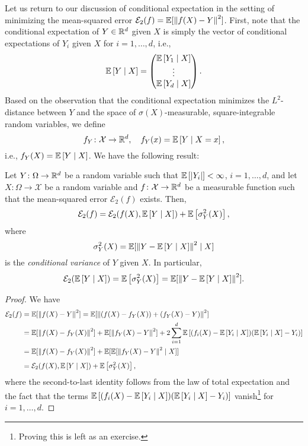 Let us return to our discussion of conditional expectation in the setting of minimizing the mean-squared error $\mathcal{E}_2(f) = \mathbb{E}[\norm{f(X) - Y}^2]$. First, note that the conditional expectation of $Y \in \mathbb{R}^d$ given $X$ is simply the vector of conditional expectations of $Y_i$ given $X$ for $i = 1, \dots, d$, i.e.,
\[
    \mathbb{E}\left[Y \mathrel{|} X\right] = \begin{pmatrix}
        \mathbb{E}\left[Y_1 \mathrel{|} X\right] \\
        \vdots \\
        \mathbb{E}\left[Y_d \mathrel{|} X\right]
    \end{pmatrix}.
\]
Based on the observation that the conditional expectation minimizes the $L^2$-distance between $Y$ and the space of $\sigma(X)$-measurable, square-integrable random variables, we define
\[
    f_Y \colon \mathcal{X} \to \mathbb{R}^d, \quad f_Y(x) = \mathbb{E}\left[Y \mathrel{|} X = x\right],
\]
i.e., $f_Y(X) = \mathbb{E}\left[Y \mathrel{|} X\right]$. We have the following result:
\begin{proposition}
\label{prop: decomposition of mean-squared error}
Let $Y \colon \Omega \to \mathbb{R}^d$ be a random variable such that $\mathbb{E}\left[\abs{Y_i}\right] < \infty$, $i = 1, \dots, d$, and let $X \colon \Omega \to \mathcal{X}$ be a random variable and $f \colon \mathcal{X} \to \mathbb{R}^d$ be a measurable function such that the mean-squared error $\mathcal{E}_2(f)$ exists. Then,
\[
    \mathcal{E}_2(f) = \mathcal{E}_2(f(X), \mathbb{E}\left[Y \mathrel{|} X\right]) + \mathbb{E}\left[\sigma_Y^2(X)\right],
\]
where
\[
    \sigma_Y^2(X) = \mathbb{E}[\norm{Y - \mathbb{E}\left[Y \mathrel{|} X\right]}^2 \mathrel{|} X]
\]
is the \emph{conditional variance} of $Y$ given $X$. In particular,
\[
    \mathcal{E}_2(\mathbb{E}\left[Y \mathrel{|} X\right]) = \mathbb{E}\left[\sigma_Y^2(X)\right] = \mathbb{E}[\norm{Y - \mathbb{E}\left[Y \mathrel{|} X\right]}^2].
\]
\end{proposition}

\begin{proof}
We have
\begin{align*}
    \mathcal{E}_2(f) &= \mathbb{E}[\norm{f(X) - Y}^2] = \mathbb{E}[\norm{(f(X) - f_Y(X)) + (f_Y(X) - Y)}^2] \\
        &= \mathbb{E}[\norm{f(X) - f_Y(X)}^2] + \mathbb{E}[\norm{f_Y(X) - Y}^2] + 2 \sum_{i=1}^d \mathbb{E}\left[(f_i(X) - \mathbb{E}\left[Y_i \mathrel{|} X\right]) (\mathbb{E}\left[Y_i \mathrel{|} X\right] - Y_i)\right] \\
        &= \mathbb{E}[\norm{f(X) - f_Y(X)}^2] + \mathbb{E}[\mathbb{E}[\norm{f_Y(X) - Y}^2 \mathrel{|} X]] \\[4pt]
        &= \mathcal{E}_2(f(X), \mathbb{E}\left[Y \mathrel{|} X\right]) + \mathbb{E}\left[\sigma_Y^2(X)\right],
\end{align*}
where the second-to-last identity follows from the law of total expectation and the fact that the terms $\mathbb{E}\left[(f_i(X) - \mathbb{E}\left[Y_i \mathrel{|} X\right]) (\mathbb{E}\left[Y_i \mathrel{|} X\right] - Y_i)\right]$ vanish\footnote{Proving this is left as an exercise.} for $i = 1, \dots, d$.
\end{proof}

